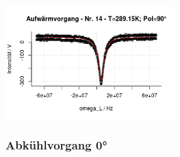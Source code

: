 \documentclass[12pt]{article}
\begin{document}
\begin{minipage}[h!]{\textwidth}
{		\includegraphics[width=0.49\textwidth]{figures/warm90-14.png}\vskip -10pt}
\end{minipage}\newpage

\subsubsection{Abkühlvorgang 0°}
\end{document}
